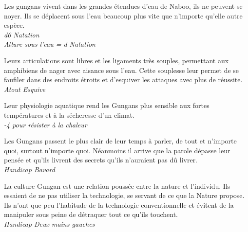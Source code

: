 \begin{description}[align=left]
\item [Aquatique] 					%
		Les gungans vivent dans les grandes étendues d’eau de Naboo, ils ne peuvent se noyer. Ils se déplacent sous l’eau beaucoup plus vite que n’importe qu’elle autre espèce.\\
		\textit{d6 Natation}\\
		\textit{Allure sous l’eau = d Natation}
		
\item [Mollusque] 					%
		Leurs articulations sont libres et les ligaments très souples, permettant aux amphibiens de nager avec aisance sous l’eau. Cette souplesse leur permet de se faufiler dans des endroits étroits et d’esquiver les attaques avec plus de réussite.\\
		\textit{Atout Esquive}

\item [Craint la chaleur] 			%
		Leur physiologie aquatique rend les Gungans plus sensible aux fortes températures et à la sécheresse d’un climat.\\
		\textit{-4 pour résister à la chaleur}

\item [Langue bien pendue] 			%
		Les Gungans passent le plus clair de leur temps à parler, de tout et n’importe quoi, surtout n’importe quoi. Néanmoins il arrive que la parole dépasse leur pensée et qu’ils livrent des secrets qu’ils n’auraient pas dû livrer.\\
		\textit{Handicap Bavard}

\item [Maladroit] 					%
		La culture Gungan est une relation poussée entre la nature et l’individu. Ils essaient de ne pas utiliser la technologie, se servant de ce que la Nature propose. Ils n’ont que peu l’habitude de la technologie conventionnelle et évitent de la manipuler sous peine de détraquer tout ce qu’ils touchent.\\
		\textit{Handicap Deux mains gauches}
\end{description}